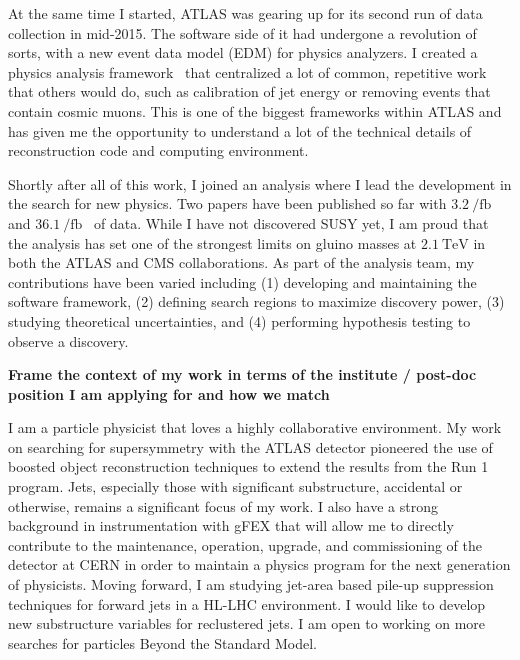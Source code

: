 \documentclass[letterpaper, 10pt]{article}
\begin{document}
At the same time I started, ATLAS was gearing up for its second run of data collection in mid-2015. The software side of it had undergone a revolution of sorts, with a new event data model (EDM) for physics analyzers. I created a physics analysis framework~ that centralized a lot of common, repetitive work that others would do, such as calibration of jet energy or removing events that contain cosmic muons. This is one of the biggest frameworks within ATLAS and has given me the opportunity to understand a lot of the technical details of reconstruction code and computing environment.

Shortly after all of this work, I joined an analysis where I lead the development in the search for new physics. Two papers have been published so far with $\SI{3.2}{\per\femto\barn}$~ and $\SI{36.1}{\per\femto\barn}$~ of data. While I have not discovered SUSY yet, I am proud that the analysis has set one of the strongest limits on gluino masses at $\SI{2.1}{\tera\electronvolt}$ in both the ATLAS and CMS collaborations. As part of the analysis team, my contributions have been varied including (1) developing and maintaining the software framework, (2) defining search regions to maximize discovery power, (3) studying theoretical uncertainties, and (4) performing hypothesis testing to observe a discovery.

\textbf{Frame the context of my work in terms of the institute / post-doc position I am applying for and how we match}

I am a particle physicist that loves a highly collaborative environment. My work on searching for supersymmetry with the ATLAS detector pioneered the use of boosted object reconstruction techniques to extend the results from the Run 1 program. Jets, especially those with significant substructure, accidental or otherwise, remains a significant focus of my work. I also have a strong background in instrumentation with gFEX that will allow me to directly contribute to the maintenance, operation, upgrade, and commissioning of the detector at CERN in order to maintain a physics program for the next generation of physicists. Moving forward, I am studying jet-area based pile-up suppression techniques for forward jets in a HL-LHC environment. I would like to develop new substructure variables for reclustered jets. I am open to working on more searches for particles Beyond the Standard Model.

\vspace{0.5cm}

\begin{footnotesize}


\end{footnotesize}
\end{document}
